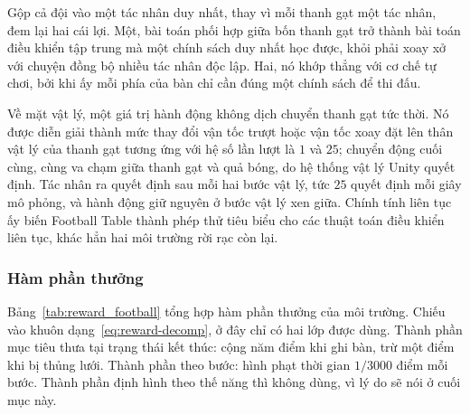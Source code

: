\indent Gộp cả đội vào một tác nhân duy nhất, thay vì mỗi thanh gạt một tác nhân, đem lại
hai cái lợi. Một, bài toán phối hợp giữa bốn thanh gạt trở thành bài toán điều khiển tập
trung mà một chính sách duy nhất học được, khỏi phải xoay xở với chuyện đồng bộ nhiều tác
nhân độc lập. Hai, nó khớp thẳng với cơ chế tự chơi, bởi khi ấy mỗi phía của bàn chỉ cần
đúng một chính sách để thi đấu.

\indent Về mặt vật lý, một giá trị hành động không dịch chuyển thanh gạt tức thời. Nó
được diễn giải thành mức thay đổi vận tốc trượt hoặc vận tốc xoay đặt lên thân vật lý của
thanh gạt tương ứng với hệ số lần lượt là $1$ và $25$; chuyển động cuối cùng, cùng
va chạm giữa thanh gạt và quả bóng, do hệ thống vật lý Unity quyết định. Tác nhân ra quyết
định sau mỗi hai bước vật lý, tức $25$ quyết định mỗi giây mô phỏng, và hành động
giữ nguyên ở bước vật lý xen giữa. Chính tính liên tục ấy biến Football Table thành phép
thử tiêu biểu cho các thuật toán điều khiển liên tục, khác hẳn hai môi trường rời rạc còn
lại.

\subsubsection{Hàm phần thưởng}
\indent Bảng~\ref{tab:reward_football} tổng hợp hàm phần thưởng của môi trường. Chiếu vào
khuôn dạng~\eqref{eq:reward-decomp}, ở đây chỉ có hai lớp được dùng. Thành phần mục tiêu
thưa tại trạng thái kết thúc: cộng năm điểm khi ghi bàn, trừ một điểm khi bị thủng lưới.
Thành phần theo bước: hình phạt thời gian $1/3000$ điểm mỗi bước. Thành phần định hình
theo thế năng thì không dùng, vì lý do sẽ nói ở cuối mục này.

